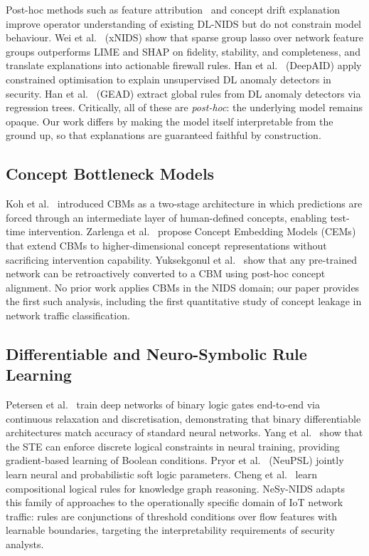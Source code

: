 \documentclass[conference]{IEEEtran}
\begin{document}
Post-hoc methods such as feature attribution~\cite{wei2023xnids} and
concept drift explanation~\cite{yang2021cade} improve operator understanding
of existing DL-NIDS but do not constrain model behaviour.
Wei et al.~\cite{wei2023xnids} (xNIDS) show that sparse group lasso over
network feature groups outperforms LIME and SHAP on fidelity, stability,
and completeness, and translate explanations into actionable firewall rules.
Han et al.~\cite{han2021deepaid} (DeepAID) apply constrained optimisation
to explain unsupervised DL anomaly detectors in security.
Han et al.~\cite{han2024gead} (GEAD) extract global rules from DL anomaly
detectors via regression trees.
Critically, all of these are \emph{post-hoc}: the underlying model remains
opaque. Our work differs by making the model itself interpretable from the
ground up, so that explanations are guaranteed faithful by construction.

\subsection{Concept Bottleneck Models}

Koh et al.~\cite{koh2020concept} introduced CBMs as a two-stage architecture
in which predictions are forced through an intermediate layer of
human-defined concepts, enabling test-time intervention.
Zarlenga et al.~\cite{zarlenga2022concept} propose Concept Embedding
Models (CEMs) that extend CBMs to higher-dimensional concept representations
without sacrificing intervention capability.
Yuksekgonul et al.~\cite{yuksekgonul2023posthoc} show that any pre-trained
network can be retroactively converted to a CBM using post-hoc concept
alignment.
No prior work applies CBMs in the NIDS domain; our paper provides the first
such analysis, including the first quantitative study of concept leakage
in network traffic classification.

\subsection{Differentiable and Neuro-Symbolic Rule Learning}

Petersen et al.~\cite{petersen2022logic} train deep networks of binary
logic gates end-to-end via continuous relaxation and discretisation,
demonstrating that binary differentiable architectures match accuracy of
standard neural networks.
Yang et al.~\cite{yang2022ste} show that the STE can enforce discrete logical
constraints in neural training, providing gradient-based learning of
Boolean conditions.
Pryor et al.~\cite{pryor2023neupsl} (NeuPSL) jointly learn neural and
probabilistic soft logic parameters.
Cheng et al.~\cite{cheng2023ncrl} learn compositional logical rules for
knowledge graph reasoning.
NeSy-NIDS adapts this family of approaches to the operationally specific
domain of IoT network traffic: rules are conjunctions of threshold
conditions over flow features with learnable boundaries, targeting
the interpretability requirements of security analysts.
\end{document}
